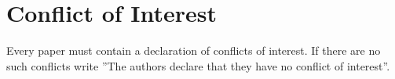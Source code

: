\section*{Conflict of Interest}

Every paper must contain a declaration of conflicts of interest. If there are no such conflicts write ''The authors declare that they have no conflict of interest''.